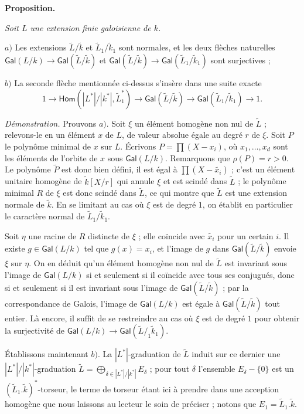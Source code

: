 \documentclass[10pt,leqno]{article}
\newcommand{\red}{\widetilde}
\newcommand{\deux}[1]{\refstepcounter{subsection}\label{#1}\medskip\noindent {\bf (\thesubsection)}\hspace{.1cm}}
\begin{document}
\medskip
\deux{redquasigal} {\bf Proposition.} {\em Soit $L$ une extension finie galoisienne de $k$. 

\medskip
$a)$ Les extensions $\red{L}/\red{k}$ et $\red{L}_1/\red{k}_1$ sont normales, et les deux flèches naturelles $\mathsf {Gal}(L/k)\to \mathsf{Gal}(\red{L}/\red{k})$ et $\mathsf{Gal}(\red{L}/\red{k})\to\mathsf{Gal}(\red{L}_1/\red{k}_1)$ sont surjectives ;

\medskip
$b)$ La seconde flèche mentionnée ci-dessus s'insère dans une suite exacte $$1\to\mathsf{Hom}(|L^{*}|/|k^{*}|,\red{L}_1^{*})\to\mathsf {Gal}(\red{L}/\red{k})\to\mathsf {Gal}(\red{L}_1/\red{k}_1)\to 1. $$} 

\medskip
{\em Démonstration.} Prouvons $a)$. Soit $\xi$ un élément homogène non nul de $\red{L}$ ; relevons-le en un élément $x$ de $L$, de valeur absolue égale au degré $r$ de $\xi$. Soit $P$ le polynôme minimal de $x$ sur $L$. Écrivons $P=\prod (X-x_{i})$, où $x_{1},\ldots,x_{d}$ sont les éléments de l'orbite de $x$ sous $\mathsf {Gal}(L/k)$. Remarquons que $\rho(P)=r>0$. Le polynôme $\red{P}$ est donc bien défini, il est égal à $\prod (X-\red{x_{i}})$ ; c'est un élément unitaire homogène de $\red{k}[X/r]$ qui annule $\xi$ et est scindé dans $\red{L}$ ; le polynôme minimal $R$ de $\xi$ est donc scindé dans $\red{L}$, ce qui montre que $\red{L}$ est une extension normale de $\red k$. En se limitant au cas où $\xi$ est de degré $1$, on établit en particulier le caractère normal de $\red{L}_1/\red{k}_1$. 

\medskip
Soit $\eta$ une racine de $R$ distincte de $\xi$ ; elle coïncide avec $\red{x_{i}}$ pour un certain $i$. Il existe $g\in \mathsf {Gal}(L/k)$ tel que $g(x)=x_{i}$, et l'image de $g$ dans $\mathsf{Gal} (\red{L}/\red{k})$ envoie $\xi$ sur $\eta$. On en déduit qu'un élément homogène non nul de $\red{L}$ est invariant sous l'image de $\mathsf {Gal}(L/k)$ si et seulement si il coïncide avec tous ses conjugués, donc si et seulement si il est invariant sous l'image de $\mathsf{Gal} (\red{L}/\red{k})$ ; par la correspondance de Galois, l'image de $\mathsf {Gal}(L/k)$ est égale à $\mathsf{Gal} (\red{L}/\red{k})$ tout entier. Là encore, il suffit de se restreindre au cas où $\xi$ est de degré $1$ pour obtenir la surjectivité de $\mathsf {Gal}(L/k)\to \mathsf{Gal}(\red{L}/_1\red{k}_1)$.

\medskip
Établissons maintenant $b)$. La $|L^*|$-graduation de $\red L$ induit sur ce dernier une $|L^*|/|k^*|$-graduation $\red L=\bigoplus\limits_{\delta\in |L^*|/|k^*|} E_\delta$ ; pour tout $\delta$ l'ensemble $E_\delta-\{0\}$ est un $(\red L_1.\red k)^*$-torseur, le terme de torseur étant ici à prendre dans une acception homogène que nous laissons au lecteur le soin de préciser ; notons que $E_1=\red L_1.\red k$.
\end{document}
